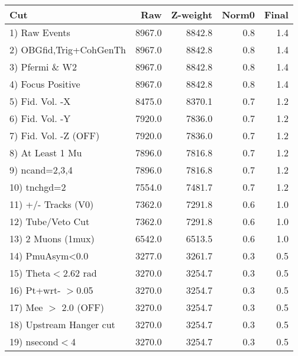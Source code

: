  \begin{table}[h!]\centering
 \begin{tabular}{||l||r|r|r|r||}
 \hline
 \hline
 Cut & Raw & Z-weight & Norm0 & Final \\
 \hline
  1) Raw Events           &      8967.0 &      8842.8 &         0.8 &         1.4 \\
  2) OBGfid,Trig+CohGenTh &      8967.0 &      8842.8 &         0.8 &         1.4 \\
  3) Pfermi \& W2         &      8967.0 &      8842.8 &         0.8 &         1.4 \\
  4) Focus Positive       &      8967.0 &      8842.8 &         0.8 &         1.4 \\
  5) Fid. Vol. -X         &      8475.0 &      8370.1 &         0.7 &         1.2 \\
  6) Fid. Vol. -Y         &      7920.0 &      7836.0 &         0.7 &         1.2 \\
  7) Fid. Vol. -Z (OFF)   &      7920.0 &      7836.0 &         0.7 &         1.2 \\
  8) At Least 1 Mu        &      7896.0 &      7816.8 &         0.7 &         1.2 \\
  9) ncand=2,3,4          &      7896.0 &      7816.8 &         0.7 &         1.2 \\
 10) tnchgd=2             &      7554.0 &      7481.7 &         0.7 &         1.2 \\
 11) +/- Tracks (V0)      &      7362.0 &      7291.8 &         0.6 &         1.0 \\
 12) Tube/Veto Cut        &      7362.0 &      7291.8 &         0.6 &         1.0 \\
 13) 2 Muons (1mux)       &      6542.0 &      6513.5 &         0.6 &         1.0 \\
 14) PmuAsym<0.0          &      3277.0 &      3261.7 &         0.3 &         0.5 \\
 15) Theta$<$2.62 rad     &      3270.0 &      3254.7 &         0.3 &         0.5 \\
 16) Pt+wrt- $>$0.05      &      3270.0 &      3254.7 &         0.3 &         0.5 \\
 17) Mee $>$ 2.0  (OFF)   &      3270.0 &      3254.7 &         0.3 &         0.5 \\
 18) Upstream Hanger cut  &      3270.0 &      3254.7 &         0.3 &         0.5 \\
 19) nsecond$<$4          &      3270.0 &      3254.7 &         0.3 &         0.5 \\

\end{tabular}
\end{table}
